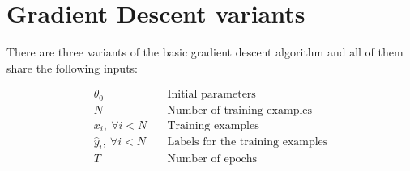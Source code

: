 \documentclass[12pt, titlepage]{article}
\begin{document}
\section{Gradient Descent variants}\label{sec:sgd_variants}
There are three variants of the basic gradient descent algorithm and all of them share the following inputs:

\begin{equation}
\begin{aligned}
\theta_0 &\quad \text{Initial parameters}\\
N &\quad \text{Number of training examples}\\
x_i,\ \forall i <  N &\quad \text{Training examples}\\
\hat{y}_i,\ \forall i < N &\quad \text{Labels for the training examples}\\
T &\quad \text{Number of epochs}
\end{aligned}
\end{equation}
\end{document}
